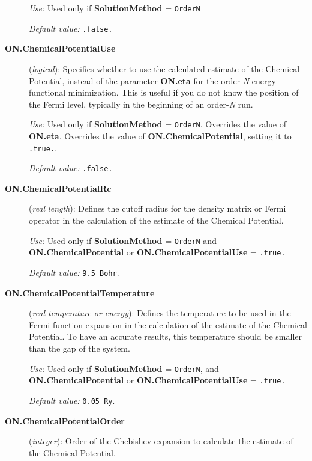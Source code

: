 \documentclass[11pt]{article}
\begin{document}
\begin{description}
{\it Use:} Used only if {\bf SolutionMethod} = {\tt OrderN}

{\it Default value:} {\tt .false.}

\item[{\bf ON.ChemicalPotentialUse}] ({\it logical}): 
Specifies whether to use the calculated estimate of the
Chemical Potential, instead of the parameter 
{\bf ON.eta} 
for the order-{\it N} energy functional minimization.
This is useful if you do not know the position
of the Fermi level, typically in the beginning
of an order-{\em N} run.

{\it Use:} Used only if {\bf SolutionMethod} = {\tt OrderN}.
Overrides the value of {\bf ON.eta}.
Overrides the value of {\bf ON.ChemicalPotential}, setting
it to {\tt .true.}.

{\it Default value:} {\tt .false.}

\item[{\bf ON.ChemicalPotentialRc}]  ({\it real length}):
Defines the cutoff radius for the density matrix or Fermi
operator in the calculation of the estimate of the
Chemical Potential.

{\it Use:} Used only if {\bf SolutionMethod} = {\tt OrderN}
and {\bf ON.ChemicalPotential} or  {\bf ON.ChemicalPotentialUse} 
= {\tt .true.}

{\it Default value:} {\tt 9.5 Bohr}.

\item[{\bf ON.ChemicalPotentialTemperature}]  ({\it real temperature 
or energy}):
Defines the temperature to be used in the Fermi function expansion
in the calculation of the estimate of the Chemical Potential.
To have an accurate results, this temperature should be smaller 
than the gap of the system.

{\it Use:} Used only if {\bf SolutionMethod} = {\tt OrderN},
and {\bf ON.ChemicalPotential} or  {\bf ON.ChemicalPotentialUse} = 
{\tt .true.}

{\it Default value:} {\tt 0.05 Ry}.

\item[{\bf ON.ChemicalPotentialOrder}] ({\it integer}):
Order of the Chebishev expansion to calculate the estimate
of the Chemical Potential. 


\end{description}
\end{document}
